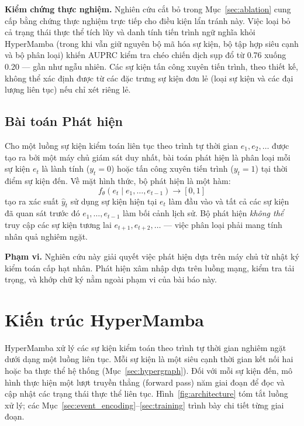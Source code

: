 \documentclass[letterpaper,twocolumn,10pt]{article}
\begin{document}
\textbf{Kiểm chứng thực nghiệm.} Nghiên cứu cắt bỏ trong Mục~\ref{sec:ablation} cung cấp bằng chứng thực nghiệm trực tiếp cho điều kiện lẩn tránh này. Việc loại bỏ cả trạng thái thực thể tích lũy và danh tính tiến trình ngữ nghĩa khỏi HyperMamba (trong khi vẫn giữ nguyên bộ mã hóa sự kiện, bộ tập hợp siêu cạnh và bộ phân loại) khiến AUPRC kiểm tra chéo chiến dịch sụp đổ từ 0.76 xuống 0.20 --- gần như ngẫu nhiên. Các sự kiện tấn công xuyên tiến trình, theo thiết kế, không thể xác định được từ các đặc trưng sự kiện đơn lẻ (loại sự kiện và các đại lượng liên tục) nếu chỉ xét riêng lẻ.

\subsection{Bài toán Phát hiện}
\label{sec:detection_task}

Cho một luồng sự kiện kiểm toán liên tục theo trình tự thời gian $e_1, e_2, \dots$ được tạo ra bởi một máy chủ giám sát duy nhất, bài toán phát hiện là phân loại mỗi sự kiện $e_t$ là lành tính ($y_t = 0$) hoặc tấn công xuyên tiến trình ($y_t = 1$) tại thời điểm sự kiện đến. Về mặt hình thức, bộ phát hiện là một hàm:
\begin{equation}
    f_\theta(e_t \mid e_1, \dots, e_{t-1}) \to [0, 1]
\end{equation}
tạo ra xác suất $\hat{y}_t$ sử dụng sự kiện hiện tại $e_t$ làm đầu vào và tất cả các sự kiện đã quan sát trước đó $e_1, \dots, e_{t-1}$ làm bối cảnh lịch sử. Bộ phát hiện \emph{không thể} truy cập các sự kiện tương lai $e_{t+1}, e_{t+2}, \dots$ --- việc phân loại phải mang tính nhân quả nghiêm ngặt.

\textbf{Phạm vi.} Nghiên cứu này giải quyết việc phát hiện dựa trên máy chủ từ nhật ký kiểm toán cấp hạt nhân. Phát hiện xâm nhập dựa trên luồng mạng, kiểm tra tải trọng, và khớp chữ ký nằm ngoài phạm vi của bài báo này.

\section{Kiến trúc HyperMamba}
\label{sec:architecture}

HyperMamba xử lý các sự kiện kiểm toán theo trình tự thời gian nghiêm ngặt dưới dạng một luồng liên tục. Mỗi sự kiện là một siêu cạnh thời gian kết nối hai hoặc ba thực thể hệ thống (Mục~\ref{sec:hypergraph}). Đối với mỗi sự kiện đến, mô hình thực hiện một lượt truyền thẳng (forward pass) năm giai đoạn để đọc và cập nhật các trạng thái thực thể liên tục. Hình~\ref{fig:architecture} tóm tắt luồng xử lý; các Mục~\ref{sec:event_encoding}--\ref{sec:training} trình bày chi tiết từng giai đoạn.
\end{document}
